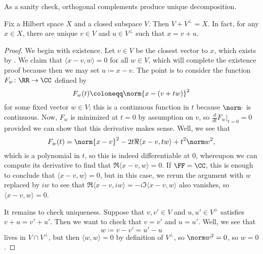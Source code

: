 \documentclass[../notes.tex]{subfiles}
\begin{document}
As a sanity check, orthogonal complements produce unique decomposition.
\begin{proposition}
	Fix a Hilbert space $X$ and a closed subspace $V$. Then $V+V^\perp=X$. In fact, for any $x\in X$, there are unique $v\in V$ and $u\in V^\perp$ such that $x=v+u$.
\end{proposition}
\begin{proof}
	We begin with existence. Let $v\in V$ be the closest vector to $x$, which exists by . We claim that $\langle x-v,w\rangle=0$ for all $w\in V$, which will complete the existence proof because then we may set $u\coloneqq x-v$. The point is to consider the function $F_w\colon\RR\to\CC$ defined by
	\[F_w(t)\coloneqq\norm{x-(v+tw)}^2\]
	for some fixed vector $w\in V$; this is a continuous function in $t$ because $\norm\cdot$ is continuous. Now, $F_w$ is minimized at $t=0$ by assumption on $v$, so $\frac d{dt}F_w\big|_{t=0}=0$ provided we can show that this derivative makes sense. Well, we see that
	\[F_w(t)=\norm{x-v}^2-2t\Re\langle x-v,tw\rangle+t^2\norm w^2,\]
	which is a polynomial in $t$, so this is indeed differentiable at $0$, whereupon we can compute its derivative to find that $\Re\langle x-v,w\rangle=0$. If $\FF=\CC$, this is enough to conclude that $\langle x-v,w\rangle=0$, but in this case, we rerun the argument with $w$ replaced by $iw$ to see that $\Re\langle x-v,iw\rangle=-i\Im\langle x-v,w\rangle$ also vanishes, so $\langle x-v,w\rangle=0$.

	It remains to check uniqueness. Suppose that $v,v'\in V$ and $u,u'\in V^\perp$ satisfies $v+u=v'+u'$. Then we want to check that $v=v'$ and $u=u'$. Well, we see that
	\[w\coloneqq v-v'=u'-u\]
	lives in $V\cap V^\perp$, but then $\langle w,w\rangle=0$ by definition of $V^\perp$, so $\norm w^2=0$, so $w=0$.
\end{proof}
\end{document}
